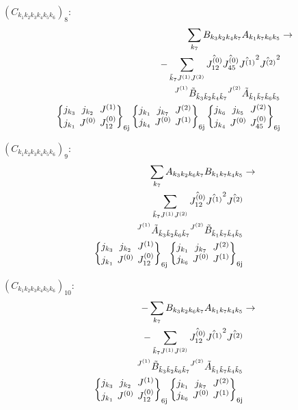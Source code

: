 \documentclass[11pt]{article}
\newcommand{\sixj}[6]{\begingroup\setlength{\arraycolsep}{0.2em}\begin{Bmatrix} #1 & #2 & #3 \\ #4 & #5 & #6 \end{Bmatrix}_{\text{6j}}\endgroup}
\begin{document}
$\left({C}_{{k}_{1}{k}_{2}{k}_{3}{k}_{4}{k}_{5}{k}_{6}}\right)_{8}$:
\begin{align}
\sum_{{k}_{7}}{B}_{{k}_{3}{k}_{2}{k}_{4}{k}_{7}}{A}_{{k}_{1}{k}_{7}{k}_{6}{k}_{5}}&\rightarrow \notag \\-\sum_{\tilde{k}_{7}J^{(1)}J^{(2)}}\hat{J^{(0)}_{12}}\hat{J^{(0)}_{45}}\hat{J^{(1)}}^{2}\hat{J^{(2)}}^{2}& \notag \\{}^{J^{(1)}}\tilde{B}_{\tilde{k}_{3}\tilde{k}_{2}\tilde{k}_{4}\tilde{k}_{7}}{}^{J^{(2)}}\tilde{A}_{\tilde{k}_{1}\tilde{k}_{7}\tilde{k}_{6}\tilde{k}_{5}}& \notag \\\sixj{j_{{k}_{3}}}{j_{{k}_{2}}}{J^{(1)}}{j_{{k}_{1}}}{J^{(0)}}{J^{(0)}_{12}}\sixj{j_{{k}_{1}}}{j_{{k}_{7}}}{J^{(2)}}{j_{{k}_{4}}}{J^{(0)}}{J^{(1)}}\sixj{j_{{k}_{6}}}{j_{{k}_{5}}}{J^{(2)}}{j_{{k}_{4}}}{J^{(0)}}{J^{(0)}_{45}}
\end{align}

$\left({C}_{{k}_{1}{k}_{2}{k}_{3}{k}_{4}{k}_{5}{k}_{6}}\right)_{9}$:
\begin{align}
\sum_{{k}_{7}}{A}_{{k}_{3}{k}_{2}{k}_{6}{k}_{7}}{B}_{{k}_{1}{k}_{7}{k}_{4}{k}_{5}}&\rightarrow \notag \\\sum_{\tilde{k}_{7}J^{(1)}J^{(2)}}\hat{J^{(0)}_{12}}\hat{J^{(1)}}^{2}\hat{J^{(2)}}& \notag \\{}^{J^{(1)}}\tilde{A}_{\tilde{k}_{3}\tilde{k}_{2}\tilde{k}_{6}\tilde{k}_{7}}{}^{J^{(2)}}\tilde{B}_{\tilde{k}_{1}\tilde{k}_{7}\tilde{k}_{4}\tilde{k}_{5}}& \notag \\\sixj{j_{{k}_{3}}}{j_{{k}_{2}}}{J^{(1)}}{j_{{k}_{1}}}{J^{(0)}}{J^{(0)}_{12}}\sixj{j_{{k}_{1}}}{j_{{k}_{7}}}{J^{(2)}}{j_{{k}_{6}}}{J^{(0)}}{J^{(1)}}
\end{align}

$\left({C}_{{k}_{1}{k}_{2}{k}_{3}{k}_{4}{k}_{5}{k}_{6}}\right)_{10}$:
\begin{align}
-\sum_{{k}_{7}}{B}_{{k}_{3}{k}_{2}{k}_{6}{k}_{7}}{A}_{{k}_{1}{k}_{7}{k}_{4}{k}_{5}}&\rightarrow \notag \\-\sum_{\tilde{k}_{7}J^{(1)}J^{(2)}}\hat{J^{(0)}_{12}}\hat{J^{(1)}}^{2}\hat{J^{(2)}}& \notag \\{}^{J^{(1)}}\tilde{B}_{\tilde{k}_{3}\tilde{k}_{2}\tilde{k}_{6}\tilde{k}_{7}}{}^{J^{(2)}}\tilde{A}_{\tilde{k}_{1}\tilde{k}_{7}\tilde{k}_{4}\tilde{k}_{5}}& \notag \\\sixj{j_{{k}_{3}}}{j_{{k}_{2}}}{J^{(1)}}{j_{{k}_{1}}}{J^{(0)}}{J^{(0)}_{12}}\sixj{j_{{k}_{1}}}{j_{{k}_{7}}}{J^{(2)}}{j_{{k}_{6}}}{J^{(0)}}{J^{(1)}}
\end{align}
\end{document}
